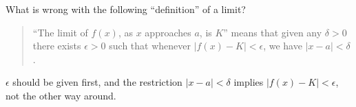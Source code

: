 {What is wrong with the following ``definition'' of a limit?
	\begin{quote}
``The limit of $f(x)$, as $x$ approaches $a$, is $K$'' means that given any $\delta>0$ there exists $\epsilon>0$ such that whenever $|f(x)-K|< \epsilon$, we have $|x-a|<\delta$.
	\end{quote}
}
{$\epsilon$ should be given first, and the restriction 	$|x-a|<\delta$ implies $|f(x)-K|< \epsilon$, not the other way around.}
